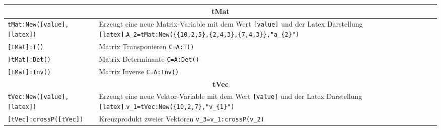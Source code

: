 \begin{table}[h]
	\begin{tabular}{|p{}|p{}|}
		\hline
		\multicolumn{2}{|c|}{\textbf{tMat}}\\
		\hline
		\lstinline{tMat:New([value],[latex])} & Erzeugt eine neue Matrix-Variable mit dem Wert \lstinline{[value]} und der Latex Darstellung \lstinline{[latex]}.\newline \lstinline!A_2=tMat:New({{10,2,5},{2,4,3},{7,4,3}},"a_{2}")!\\
		\hline
		\lstinline{[tMat]:T()} & Matrix Transponieren \newline \lstinline!C=A:T()!\\
		\hline
		\lstinline{[tMat]:Det()} & Matrix Determinante \newline \lstinline!C=A:Det()!\\
		\hline
		\lstinline{[tMat]:Inv()} & Matrix Inverse \newline \lstinline!C=A:Inv()!\\
		\hline
		\multicolumn{2}{|c|}{\textbf{tVec}}\\
		\hline
		\lstinline{tVec:New([value],[latex])} & Erzeugt eine neue Vektor-Variable mit dem Wert \lstinline{[value]} und der Latex Darstellung \lstinline{[latex]}.\newline \lstinline!v_1=tVec:New({10,2,7},"v_{1}")!\\
		\hline
		\lstinline{[tVec]:crossP([tVec])} & Kreuzprodukt zweier Vektoren \newline \lstinline!v_3=v_1:crossP(v_2)!\\
		\hline
	\end{tabular}
\end{table}

